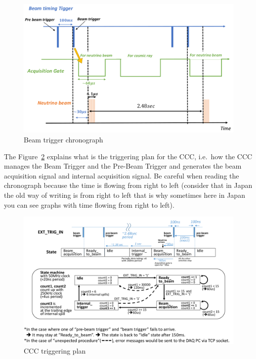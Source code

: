 \begin{figure}[H]
  \centering \includegraphics[width=\linewidth]{beam-trigger-chronograph}
  \caption{Beam trigger chronograph}\label{fig:beam-trigger-chronograph}
\end{figure}

The Figure~\ref{fig:CCC-triggering-plan} explains what is the triggering plan
for the CCC, i.e.\ how the CCC manages the Beam Trigger and the Pre-Beam Trigger
and generates the beam acquisition signal and internal acquisition signal. Be
careful when reading the chronograph because the time is flowing from right to
left (consider that in Japan the old way of writing is from right to left that
is why sometimes here in Japan you can see graphs with time flowing from right
to left).
\begin{figure}[H]
  \centering \includegraphics[width=\linewidth]{CCC-triggering-plan}
  \caption{CCC triggering plan}\label{fig:CCC-triggering-plan}
\end{figure}



